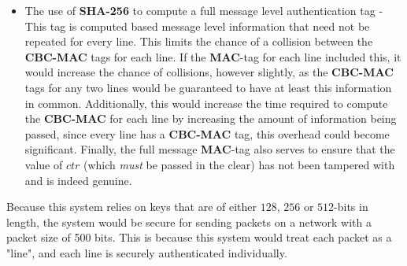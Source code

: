\documentclass[../midterm.tex]{subfiles}
\begin{document}
\begin{flushleft}
\begin{itemize}
	\item The use of \textbf{SHA-256} to compute a full message level authentication tag - This tag is computed based message level information that need not be repeated for every line.  This limits the chance of a collision between the \textbf{CBC-MAC} tags for each line.  If the \textbf{MAC}-tag for each line included this, it would increase the chance of collisions, however slightly, as the \textbf{CBC-MAC} tags for any two lines would be guaranteed to have at least this information in common.  Additionally, this would increase the time required to compute the \textbf{CBC-MAC} for each line by increasing the amount of information being passed, since every line has a \textbf{CBC-MAC} tag, this overhead could become significant.  Finally, the full message \textbf{MAC}-tag also serves to ensure that the value of $ctr$ (which \emph{must} be passed in the clear) has not been tampered with and is indeed genuine.
\end{itemize}

Because this system relies on keys that are of either $128$, $256$ or $512$-bits in length, the system would be secure for sending packets on a network with a packet size of 500 bits.  This is because this system would treat each packet as a "line", and each line is securely authenticated individually. \newline





\end{flushleft}
\end{document}
